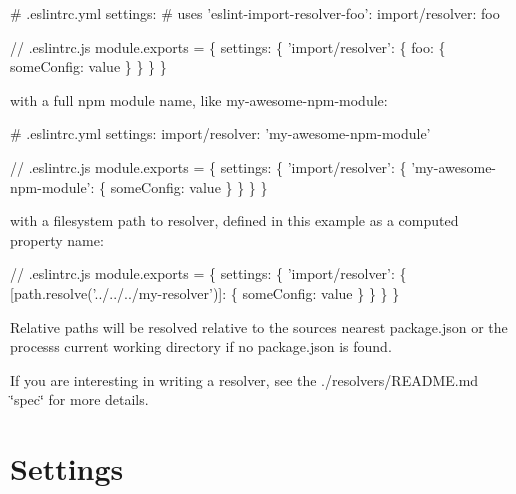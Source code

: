 \begin{DoxyCode}
# .eslintrc.yml
settings:
  # uses 'eslint-import-resolver-foo':
  import/resolver: foo
\end{DoxyCode}
 
\begin{DoxyCode}
// .eslintrc.js
module.exports = \{
  settings: \{
    'import/resolver': \{
      foo: \{ someConfig: value \}
    \}
  \}
\}
\end{DoxyCode}



\begin{DoxyItemize}
\item with a full npm module name, like {\ttfamily my-\/awesome-\/npm-\/module}\+:
\end{DoxyItemize}


\begin{DoxyCode}
# .eslintrc.yml
settings:
  import/resolver: 'my-awesome-npm-module'
\end{DoxyCode}
 
\begin{DoxyCode}
// .eslintrc.js
module.exports = \{
  settings: \{
    'import/resolver': \{
      'my-awesome-npm-module': \{ someConfig: value \}
    \}
  \}
\}
\end{DoxyCode}



\begin{DoxyItemize}
\item with a filesystem path to resolver, defined in this example as a {\ttfamily computed property} name\+:
\end{DoxyItemize}


\begin{DoxyCode}
// .eslintrc.js
module.exports = \{
  settings: \{
    'import/resolver': \{
      [path.resolve('../../../my-resolver')]: \{ someConfig: value \}
    \}
  \}
\}
\end{DoxyCode}


Relative paths will be resolved relative to the source\textquotesingle{}s nearest {\ttfamily package.\+json} or the process\textquotesingle{}s current working directory if no {\ttfamily package.\+json} is found.

If you are interesting in writing a resolver, see the ./resolvers/\+R\+E\+A\+D\+ME.md \char`\"{}spec\char`\"{} for more details.

\section*{Settings}

